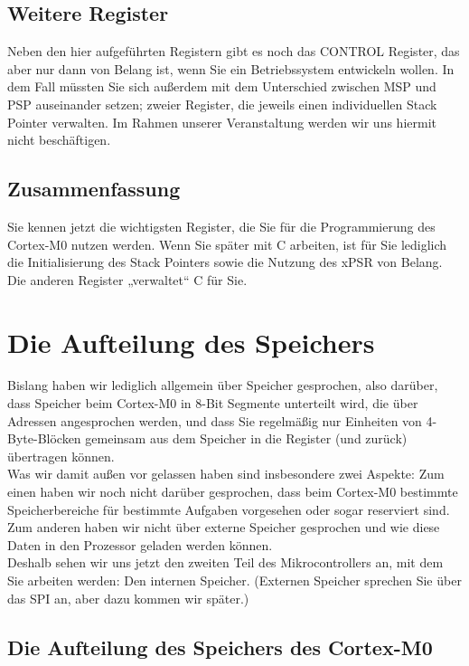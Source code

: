 \subsection{Weitere Register}

Neben den hier aufgeführten Registern gibt es noch das CONTROL Register, das aber nur dann von Belang ist, wenn Sie ein Betriebssystem entwickeln wollen. In dem Fall müssten Sie sich außerdem mit dem Unterschied zwischen MSP und PSP auseinander setzen; zweier Register, die jeweils einen individuellen Stack Pointer verwalten. Im Rahmen unserer Veranstaltung werden wir uns hiermit nicht beschäftigen.

\subsection{Zusammenfassung}

Sie kennen jetzt die wichtigsten Register, die Sie für die Programmierung des Cortex-M0 nutzen werden. Wenn Sie später mit C arbeiten, ist für Sie lediglich die Initialisierung des Stack Pointers sowie die Nutzung des xPSR von Belang. Die anderen Register „verwaltet“ C für Sie.

\section{Die Aufteilung des Speichers}

Bislang haben wir lediglich allgemein über Speicher gesprochen, also darüber, dass Speicher beim Cortex-M0 in 8-Bit Segmente unterteilt wird, die über Adressen angesprochen werden, und dass Sie regelmäßig nur Einheiten von 4-Byte-Blöcken gemeinsam aus dem Speicher in die Register (und zurück) übertragen können.\\

Was wir damit außen vor gelassen haben sind insbesondere zwei Aspekte: Zum einen haben wir noch nicht darüber gesprochen, dass beim Cortex-M0 bestimmte Speicherbereiche für bestimmte Aufgaben vorgesehen oder sogar reserviert sind. Zum anderen haben wir nicht über externe Speicher gesprochen und wie diese Daten in den Prozessor geladen werden können.\\

Deshalb sehen wir uns jetzt den zweiten Teil des Mikrocontrollers an, mit dem Sie arbeiten werden: Den internen Speicher. (Externen Speicher sprechen Sie über das SPI an, aber dazu kommen wir später.)\\

\subsection{Die Aufteilung des Speichers des Cortex-M0}

